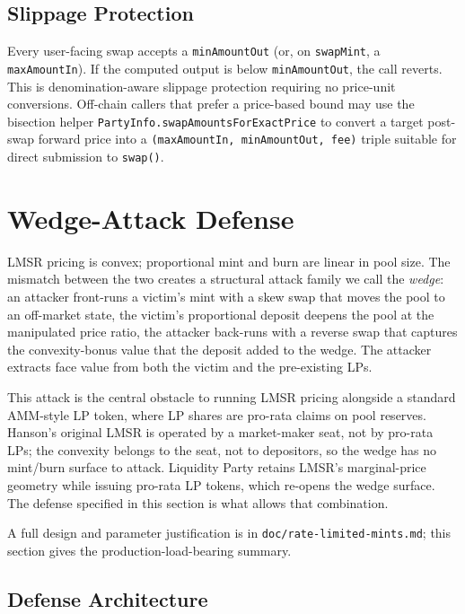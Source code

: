 \documentclass[11pt]{article}
\begin{document}
\subsection{Slippage Protection}

Every user-facing swap accepts a \texttt{minAmountOut} (or, on
\texttt{swapMint}, a \texttt{maxAmountIn}). If the computed output is below
\texttt{minAmountOut}, the call reverts. This is denomination-aware slippage
protection requiring no price-unit conversions. Off-chain callers that prefer
a price-based bound may use the bisection helper
\texttt{PartyInfo.swapAmountsForExactPrice} to convert a target post-swap
forward price into a \texttt{(maxAmountIn, minAmountOut, fee)} triple suitable
for direct submission to \texttt{swap()}.

\section{Wedge-Attack Defense}
\label{sec:wedge}

LMSR pricing is convex; proportional mint and burn are linear in pool
size. The mismatch between the two creates a structural attack family
we call the \emph{wedge}: an attacker front-runs a victim's mint with a
skew swap that moves the pool to an off-market state, the victim's
proportional deposit deepens the pool at the manipulated price ratio,
the attacker back-runs with a reverse swap that captures the
convexity-bonus value that the deposit added to the wedge. The
attacker extracts face value from both the victim and the pre-existing
LPs.

This attack is the central obstacle to running LMSR pricing alongside
a standard AMM-style LP token, where LP shares are pro-rata claims on
pool reserves. Hanson's original LMSR is operated by a market-maker
seat, not by pro-rata LPs; the convexity belongs to the seat, not to
depositors, so the wedge has no mint/burn surface to attack. Liquidity
Party retains LMSR's marginal-price geometry while issuing pro-rata LP
tokens, which re-opens the wedge surface. The defense specified in
this section is what allows that combination.

A full design and parameter justification is in
\texttt{doc/rate-limited-mints.md}; this section gives the
production-load-bearing summary.

\subsection{Defense Architecture}
\label{sec:wedge-arch}
\end{document}
